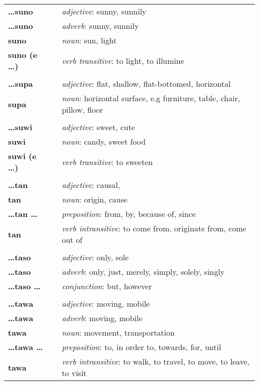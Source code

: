 \begin{supertabular}{p{2,5cm}|ll}
\textbf{\dots suno} && \textit{adjective}: sunny, sunnily \\ 
\textbf{\dots suno} && \textit{adverb}: sunny, sunnily \\ 
\textbf{suno} && \textit{noun}: sun, light \\ 
\textbf{suno (e \dots)} && \textit{verb transitive}: to light, to illumine \\ 
 && \\ %
 \textbf{\dots supa} && \textit{adjective}: flat, shallow, flat-bottomed, horizontal \\ 
\textbf{supa} && \textit{noun}: horizontal surface, e.g furniture, table, chair, pillow, floor \\ 
 && \\ %
\textbf{\dots suwi} && \textit{adjective}: sweet, cute \\ 
\textbf{suwi} && \textit{noun}: candy, sweet food \\ 
\textbf{suwi (e \dots)} && \textit{verb transitive}: to sweeten \\ 
 && \\ %
\textbf{\dots tan} && \textit{adjective}: causal, \\ 
\textbf{tan} && \textit{noun}: origin, cause \\ 
\textbf{\dots tan \dots} && \textit{preposition}: from, by, because of, since \\ 
\textbf{tan} && \textit{verb intransitive}: to come from, originate from, come out of \\ 
 && \\ %
\textbf{\dots taso} && \textit{adjective}: only, sole \\ 
\textbf{\dots taso} && \textit{adverb}: only, just, merely, simply, solely, singly \\ 
\textbf{\dots taso \dots} && \textit{conjunction}: but, however \\ 
 && \\ %
\textbf{\dots tawa} && \textit{adjective}: moving, mobile \\ 
\textbf{\dots tawa} && \textit{adverb}: moving, mobile \\ 
\textbf{tawa} && \textit{noun}: movement, transportation \\ 
\textbf{\dots tawa \dots} && \textit{preposition}: to, in order to, towards, for, until \\ 
\textbf{tawa} && \textit{verb intransitive}: to walk, to travel, to move, to leave, to visit \\ 

\end{supertabular}
